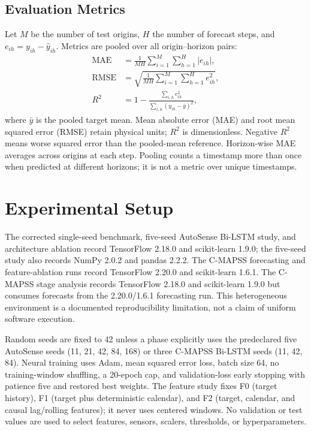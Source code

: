 \documentclass[conference]{IEEEtran}
\begin{document}
\subsection{Evaluation Metrics}
Let $M$ be the number of test origins, $H$ the number of forecast steps, and $e_{ih}=y_{ih}-\hat y_{ih}$. Metrics are pooled over all origin--horizon pairs:
\begin{align}
\mathrm{MAE}&=\frac{1}{MH}\sum_{i=1}^{M}\sum_{h=1}^{H}|e_{ih}|,\\
\mathrm{RMSE}&=\sqrt{\frac{1}{MH}\sum_{i=1}^{M}\sum_{h=1}^{H}e_{ih}^{2}},\\
R^2&=1-\frac{\sum_{i,h}e_{ih}^{2}}{\sum_{i,h}(y_{ih}-\bar y)^2},
\end{align}
where $\bar y$ is the pooled target mean. Mean absolute error (MAE) and root mean squared error (RMSE) retain physical units; $R^2$ is dimensionless. Negative $R^2$ means worse squared error than the pooled-mean reference. Horizon-wise MAE averages across origins at each step. Pooling counts a timestamp more than once when predicted at different horizons; it is not a metric over unique timestamps.

\section{Experimental Setup}
The corrected single-seed benchmark, five-seed AutoSense Bi-LSTM study, and
architecture ablation record TensorFlow 2.18.0 and scikit-learn 1.9.0; the
five-seed study also records NumPy 2.0.2 and pandas 2.2.2. The C-MAPSS
forecasting and feature-ablation runs record TensorFlow 2.20.0 and
scikit-learn 1.6.1. The C-MAPSS stage analysis records TensorFlow 2.18.0 and
scikit-learn 1.9.0 but consumes forecasts from the 2.20.0/1.6.1 forecasting
run. This heterogeneous environment is a documented reproducibility
limitation, not a claim of uniform software execution.

Random seeds are fixed to 42 unless a phase explicitly uses the predeclared
five AutoSense seeds (11, 21, 42, 84, 168) or three C-MAPSS Bi-LSTM seeds
(11, 42, 84). Neural training uses Adam, mean squared error loss, batch size
64, no training-window shuffling, a 20-epoch cap, and validation-loss early
stopping with patience five and restored best weights. The feature study fixes
F0 (target history), F1 (target plus deterministic calendar), and F2 (target,
calendar, and causal lag/rolling features); it never uses centered windows.
No validation or test values are used to select features, sensors, scalers, thresholds, or
hyperparameters.
\end{document}
